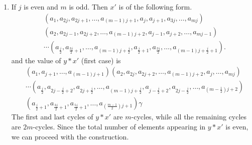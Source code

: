 \documentclass[oneside]{amsart}
\theoremstyle{plain}
\theoremstyle{definition}
\theoremstyle{remark}
\begin{document}
\begin{enumerate}
\begin{enumerate}
\begin{align*}
                        &(a_1, a_{2j}, a_{2j + 1}, \ldots ,a_{(m - 2)j + 1}, a_{mj})(a_2, a_{2j - 1}, a_{2j + 2}, \ldots ,a_{(m - 2)j + 2}, a_{mj - 1})\\ 
                        &\ldots (a_j, a_{j + 1}, a_{3j}, \ldots ,a_{(m - 1)j}, a_{(m - 1)j + 1})
                    \end{align*}
                    and the value of $y*x'$ (first case) is
                    \begin{align*}
                        &(a_1, a_{j + 1}, \ldots ,a_{(m - 1)j + 1})(a_2, a_{2j}, \ldots ,a_{(m - 2)j + 2}, a_{mj})\\
                        &\ldots (a_j, a_{j + 2}, \ldots ,a_{(m - 1)j + 2})\gamma
                    \end{align*}
                    Here each cycle is an $m$-cycle and since $m$ is even we can proceed with the construction.
                    \item If $j$ is even and $m$ is odd. Then $x'$ is of the following form.
                    \begin{align*}
                        &(a_1, a_{2j}, a_{2j + 1}, \ldots ,a_{(m - 1)j + 1}, a_j, a_{j + 1}, a_{3j},\ldots,  a_{mj})\\
                        &(a_2, a_{2j - 1}, a_{2j + 2}, \ldots ,a_{(m - 1)j + 2}, a_{j - 1}, a_{j + 2}, \ldots ,a_{mj - 1})\\
                        &\cdots(a_{\frac{j}{2}}, a_{\frac{3j}{2} + 1}, \ldots ,a_{(m - 1)j + \frac{j}{2}}, a_{\frac{j}{2} + 1}, a_{\frac{3j}{2}}, \ldots, a_{(m - 1)j + \frac{j}{2} + 1}).
                    \end{align*}
                    and the value of $y*x'$ (first case) is
                    \begin{align*}
                        &(a_1, a_{j + 1}, \ldots, a_{(m - 1)j + 1})(a_2, a_{2j}, a_{2j + 2}, \ldots ,a_{(m - 1)j + 2}, a_{j},\ldots, a_{mj})\\
                        &\cdots (a_{\frac{j}{2}}, a_{2j - \frac{j}{2} + 2}, a_{2j + \frac{j}{2}}, \ldots ,a_{(m - 1)j + \frac{j}{2}}, a_{j - \frac{j}{2} + 2}, a_{2j - \frac{j}{2}}, \ldots, a_{(m - \frac{1}{2})j + 2})\\
                        &(a_{\frac{j}{2} + 1}, a_{\frac{3j}{2} + 1}, a_{\frac{5j}{2} + 1},\ldots ,a_{(\frac{m-1}{2})j + 1})\gamma
                    \end{align*}
                    The first and last cycles of $y * x'$ are $m$-cycles, while all the remaining cycles are $2m$-cycles. Since the total number of elements appearing in $y * x'$ is even, we can proceed with the construction.

\end{enumerate}
\end{enumerate}
\end{document}
